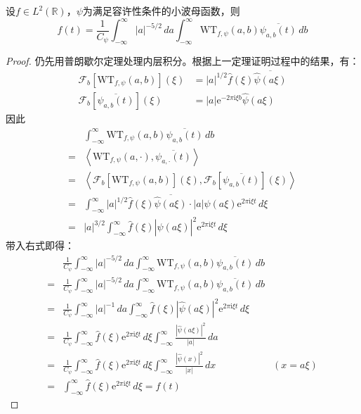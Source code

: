 \begin{theorem}[小波变换反演公式]
    设$f\in L^2(\mathbb{R})$，$\psi$为满足容许性条件的小波母函数，则
    \[f(t)=\frac{1}{C_{\psi}}\int_{-\infty}^{\infty}|a|^{-5/2}\,da\int_{-\infty}^{\infty}\mathrm{WT} _{f,\psi}(a,b)\overline{\psi_{a,b}(t)}\,db\]    
\end{theorem}
\begin{proof}
    仍先用普朗歇尔定理处理内层积分。根据上一定理证明过程中的结果，有：
    \begin{align*}
        \mathcal{F} _b[\mathrm{WT} _{f,\psi}(a,b)](\xi)&=|a|^{1/2}\hat{f}(\xi)\overline{\hat{\psi}(a\xi)}\\
        \mathcal{F} _b[\overline{\psi_{a,b}(t)}](\xi)&=|a|\mathrm{e}^{-2\pi \mathrm{i}\xi b}\hat{\psi}(a\xi)
    \end{align*}
    因此
    \begin{align*}
        &\int_{-\infty}^{\infty}\mathrm{WT} _{f,\psi}(a,b)\overline{\psi_{a,b}(t)}\,db\\
        =&\left\langle \mathrm{WT} _{f,\psi}(a,\cdot),\overline{\psi_{a,\cdot}(t)}\right\rangle\\
        =&\left\langle \mathcal{F} _b[\mathrm{WT} _{f,\psi}(a,b)](\xi),\mathcal{F} _b[\overline{\psi_{a,b}(t)}](\xi)\right\rangle\\
        =&\int_{-\infty}^{\infty}|a|^{1/2}\hat{f}(\xi)\overline{\hat{\psi}(a\xi)}\cdot |a| \hat{\psi}(a\xi)\mathrm{e}^{2\pi \mathrm{i}\xi t}\,d\xi\\
        =&|a|^{3/2}\int_{-\infty}^{\infty}\hat{f}(\xi)|\hat{\psi}(a\xi)|^2 \mathrm{e}^{2\pi \mathrm{i}\xi t}\,d\xi
    \end{align*}
    带入右式即得：
    \begin{align*}
        &\frac{1}{C_{\psi}}\int_{-\infty}^{\infty}|a|^{-5/2}\,da\int_{-\infty}^{\infty}\mathrm{WT} _{f,\psi}(a,b)\overline{\psi_{a,b}(t)}\,db\\
        =&\frac{1}{C_{\psi}}\int_{-\infty}^{\infty}|a|^{-5/2}\,da\int_{-\infty}^{\infty}\mathrm{WT} _{f,\psi}(a,b)\overline{\psi_{a,b}(t)}\,db\\
        =&\frac{1}{C_{\psi}}\int_{-\infty}^{\infty}|a|^{-1}\,da\int_{-\infty}^{\infty}\hat{f}(\xi)|\hat{\psi}(a\xi)|^2 \mathrm{e}^{2\pi \mathrm{i}\xi t}\,d\xi\\
        =&\frac{1}{C_{\psi}}\int_{-\infty}^{\infty}\hat{f}(\xi)\mathrm{e}^{2\pi \mathrm{i}\xi t}\,d\xi\int_{-\infty}^{\infty}\frac{|\hat{\psi}(a\xi)|^2}{|a|}\,da\\
        =&\frac{1}{C_{\psi}}\int_{-\infty}^{\infty}\hat{f}(\xi)\mathrm{e}^{2\pi \mathrm{i}\xi t}\,d\xi\int_{-\infty}^{\infty}\frac{|\hat{\psi}(x)|^2}{|x|}\,dx&(x=a\xi)\\
        =&\int_{-\infty}^{\infty}\hat{f}(\xi)\mathrm{e}^{2\pi \mathrm{i}\xi t}\,d\xi=f(t)
    \end{align*}
\end{proof}

